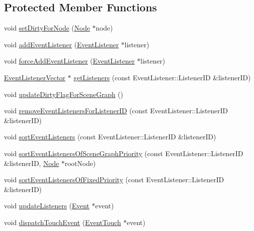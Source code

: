 \subsection*{Protected Member Functions}
\begin{DoxyCompactItemize}
\item 
void \hyperlink{classEventDispatcher_ad6b4737e5007cd150b894a49d8f6ea28}{set\+Dirty\+For\+Node} (\hyperlink{classNode}{Node} $\ast$node)
\item 
void \hyperlink{classEventDispatcher_aacb9cc74f76d66952e749f2cc1519444}{add\+Event\+Listener} (\hyperlink{classEventListener}{Event\+Listener} $\ast$listener)
\item 
void \hyperlink{classEventDispatcher_aaf736dd2a383a114e59be39e967fb0f3}{force\+Add\+Event\+Listener} (\hyperlink{classEventListener}{Event\+Listener} $\ast$listener)
\item 
\hyperlink{classEventDispatcher_1_1EventListenerVector}{Event\+Listener\+Vector} $\ast$ \hyperlink{classEventDispatcher_abbb502e7918b7d2e0033e2e6206b4e1e}{get\+Listeners} (const Event\+Listener\+::\+Listener\+ID \&listener\+ID)
\item 
void \hyperlink{classEventDispatcher_a281d3a00951ec4a7b628bc5a08d2b309}{update\+Dirty\+Flag\+For\+Scene\+Graph} ()
\item 
void \hyperlink{classEventDispatcher_a456c75992716910637994a70ee65a37e}{remove\+Event\+Listeners\+For\+Listener\+ID} (const Event\+Listener\+::\+Listener\+ID \&listener\+ID)
\item 
void \hyperlink{classEventDispatcher_ab194c90a0a72abc2e53f922abc1fa7e4}{sort\+Event\+Listeners} (const Event\+Listener\+::\+Listener\+ID \&listener\+ID)
\item 
void \hyperlink{classEventDispatcher_a6afb74a0ae37c6653e50f5cddfaa0dd2}{sort\+Event\+Listeners\+Of\+Scene\+Graph\+Priority} (const Event\+Listener\+::\+Listener\+ID \&listener\+ID, \hyperlink{classNode}{Node} $\ast$root\+Node)
\item 
void \hyperlink{classEventDispatcher_a83e6fcd45dbc28743b3dc015a3061ef2}{sort\+Event\+Listeners\+Of\+Fixed\+Priority} (const Event\+Listener\+::\+Listener\+ID \&listener\+ID)
\item 
void \hyperlink{classEventDispatcher_a936a4600edda5168541a8ab42dd27056}{update\+Listeners} (\hyperlink{classEvent}{Event} $\ast$event)
\item 
void \hyperlink{classEventDispatcher_a5dd8af31b358bbe217180ac29909b3aa}{dispatch\+Touch\+Event} (\hyperlink{classEventTouch}{Event\+Touch} $\ast$event)

\end{DoxyCompactItemize}
